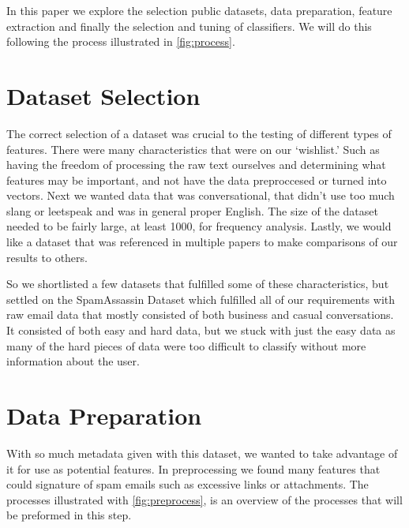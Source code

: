 \documentclass[12pt]{article}
\begin{document}
\begin{multicols}{2}
            In this paper we explore the selection public datasets, data preparation,
            feature extraction and finally the selection and tuning of classifiers.
            We will do this following the process illustrated in \autoref{fig:process}.
        \section{Dataset Selection}
            The correct selection of a dataset was crucial to the testing of 
            different types of features. There were many characteristics that were
            on our `wishlist.' Such as having the freedom of processing 
            the raw text ourselves and determining what features may be important, 
            and not have the data preproccesed or turned into vectors.
            Next we wanted data that was conversational, that didn't use too much 
            slang or leetspeak and was in general proper English. The size of the
            dataset needed to be fairly large, at least 1000, for frequency analysis.
            Lastly, we would like a dataset that was referenced in multiple papers to make comparisons
            of our results to others. 
            
            So we shortlisted a few datasets that fulfilled some of these characteristics, but
            settled on the SpamAssassin Dataset which fulfilled all of our requirements
            with raw email data that mostly consisted of both business and casual
            conversations\cite{sa_dataset}. It consisted of both easy and hard data, but we stuck with
            just the easy data as many of the hard pieces of data were too difficult
            to classify without more information about the user.

        \section{Data Preparation}
            
            With so much metadata given with this dataset, we wanted to take advantage
            of it for use as potential features. In preprocessing we found many features
            that could signature of spam emails such as excessive links or attachments.
            The processes illustrated with \autoref{fig:preprocess}, is an overview
            of the processes that will be preformed in this step.



\end{multicols}
\end{document}

